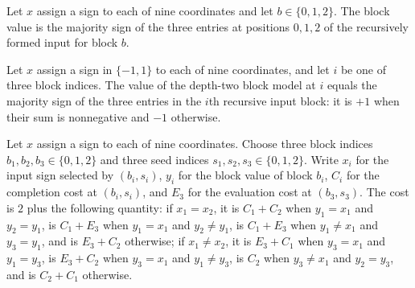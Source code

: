 \begin{definition}
\label{FABL.depthTwoBlockModelValue}
\leanok
{}
Let $x$ assign a sign to each of nine coordinates and let $b\in\{0,1,2\}$. The block
value is the majority sign of the three entries at positions $0,1,2$ of the recursively
formed input for block $b$.
\end{definition}

\begin{theorem}
\label{FABL.depthTwoBlockModelValue_eq_majority}
\leanok
{}
Let $x$ assign a sign in $\{ -1,1 \}$ to each of nine coordinates, and let $i$ be one
of three block indices. The value of the depth-two block model at $i$ equals the
majority sign of the three entries in the $i$th recursive input block: it is $+1$ when
their sum is nonnegative and $-1$ otherwise.
\end{theorem}

\begin{definition}
\label{FABL.depthTwoInterleavedModelCostOrdered}
\leanok
{}
Let $x$ assign a sign to each of nine coordinates. Choose three block indices
$b_1,b_2,b_3\in\{0,1,2\}$ and three seed indices $s_1,s_2,s_3\in\{0,1,2\}$. Write $x_i$
for the input sign selected by $(b_i,s_i)$, $y_i$ for the block value of block $b_i$,
$C_i$ for the completion cost at $(b_i,s_i)$, and $E_3$ for the evaluation cost at
$(b_3,s_3)$. The cost is $2$ plus the following quantity: if $x_1=x_2$, it is $C_1+C_2$
when $y_1=x_1$ and $y_2=y_1$, is $C_1+E_3$ when $y_1=x_1$ and $y_2\ne y_1$, is $C_1+E_3$
when $y_1\ne x_1$ and $y_3=y_1$, and is $E_3+C_2$ otherwise; if $x_1\ne x_2$, it is
$E_3+C_1$ when $y_3=x_1$ and $y_1=y_3$, is $E_3+C_2$ when $y_3=x_1$ and $y_1\ne y_3$, is
$C_2$ when $y_3\ne x_1$ and $y_2=y_3$, and is $C_2+C_1$ otherwise.
\end{definition}


